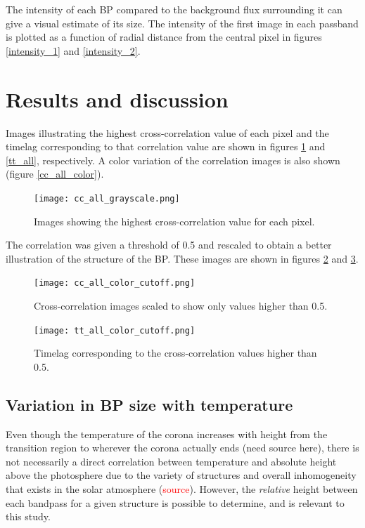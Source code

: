 \documentclass[preprint]{aastex}   %
\begin{document}
The intensity of each BP compared to the background flux surrounding it
can give a visual estimate
of its size. The intensity of the first image in each
passband is plotted as a function of radial distance from the central pixel in figures
\ref{intensity_1} and \ref{intensity_2}.


\section{Results and discussion}\label{results}
Images illustrating the highest cross-correlation value of each pixel and the
timelag corresponding to that correlation value are shown in figures \ref{cc_all}
and \ref{tt_all}, respectively. A color variation of the correlation images
is also shown (figure \ref{cc_all_color}).

\begin{figure}[htb!]
    \texttt{[image: cc\_all\_grayscale.png]}
    \caption{Images showing the highest cross-correlation value for each pixel. }
    \label{cc_all}
\end{figure}

The correlation was given a threshold of 0.5 and rescaled to obtain a
better illustration of the structure of the BP. These images are shown in
figures \ref{cc} and \ref{tt}.

\begin{figure}[htb!]
    \texttt{[image: cc\_all\_color\_cutoff.png]}
    \caption{Cross-correlation images scaled to show only values higher than 0.5.}
    \label{cc}
\end{figure}
\begin{figure}[htb!]
    \texttt{[image: tt\_all\_color\_cutoff.png]}
    \caption{Timelag corresponding to the cross-correlation values higher than 0.5.}
    \label{tt}
\end{figure}


\subsection{Variation in BP size with temperature}
Even though the temperature of the corona increases with height from the transition
region to wherever the corona actually ends (need source here), there is not necessarily
a direct correlation between temperature and absolute height above the photosphere
due to the variety of structures
and overall inhomogeneity that exists in the solar atmosphere (\textcolor{red}{source}).
However, the \emph{relative} height between each bandpass for a given structure is
possible to determine, and is relevant to this study.
\end{document}
